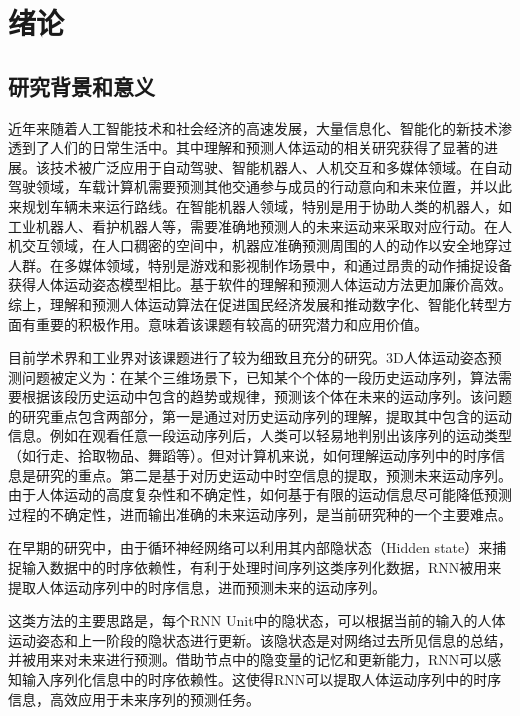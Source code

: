 \chapter{绪论}
%
\section{研究背景和意义}
\label{section:1.1}
近年来随着人工智能技术和社会经济的高速发展，大量信息化、智能化的新技术渗透到了人们的日常生活中。其中理解和预测人体运动的相关研究获得了显著的进展。该技术被广泛应用于自动驾驶、智能机器人、人机交互和多媒体领域。在自动驾驶领域，车载计算机需要预测其他交通参与成员的行动意向和未来位置，并以此来规划车辆未来运行路线。在智能机器人领域，特别是用于协助人类的机器人，如工业机器人、看护机器人等，需要准确地预测人的未来运动来采取对应行动。在人机交互领域，在人口稠密的空间中，机器应准确预测周围的人的动作以安全地穿过人群。在多媒体领域，特别是游戏和影视制作场景中，和通过昂贵的动作捕捉设备获得人体运动姿态模型相比。基于软件的理解和预测人体运动方法更加廉价高效。综上，理解和预测人体运动算法在促进国民经济发展和推动数字化、智能化转型方面有重要的积极作用。意味着该课题有较高的研究潜力和应用价值。

目前学术界和工业界对该课题进行了较为细致且充分的研究。3D人体运动姿态预测问题被定义为：在某个三维场景下，已知某个个体的一段历史运动序列，算法需要根据该段历史运动中包含的趋势或规律，预测该个体在未来的运动序列。该问题的研究重点包含两部分，第一是通过对历史运动序列的理解，提取其中包含的运动信息。例如在观看任意一段运动序列后，人类可以轻易地判别出该序列的运动类型（如行走、拾取物品、舞蹈等）。但对计算机来说，如何理解运动序列中的时序信息是研究的重点。第二是基于对历史运动中时空信息的提取，预测未来运动序列。由于人体运动的高度复杂性和不确定性，如何基于有限的运动信息尽可能降低预测过程的不确定性，进而输出准确的未来运动序列，是当前研究种的一个主要难点。

在早期的研究中，由于循环神经网络\parencite{zaremba2014recurrent}可以利用其内部隐状态（Hidden state）来捕捉输入数据中的时序依赖性，有利于处理时间序列这类序列化数据，RNN被用来提取人体运动序列中的时序信息，进而预测未来的运动序列。

这类方法的主要思路是，每个RNN Unit中的隐状态，可以根据当前的输入的人体运动姿态和上一阶段的隐状态进行更新。该隐状态是对网络过去所见信息的总结，并被用来对未来进行预测。借助节点中的隐变量的记忆和更新能力，RNN可以感知输入序列化信息中的时序依赖性。这使得RNN可以提取人体运动序列中的时序信息，高效应用于未来序列的预测任务。

